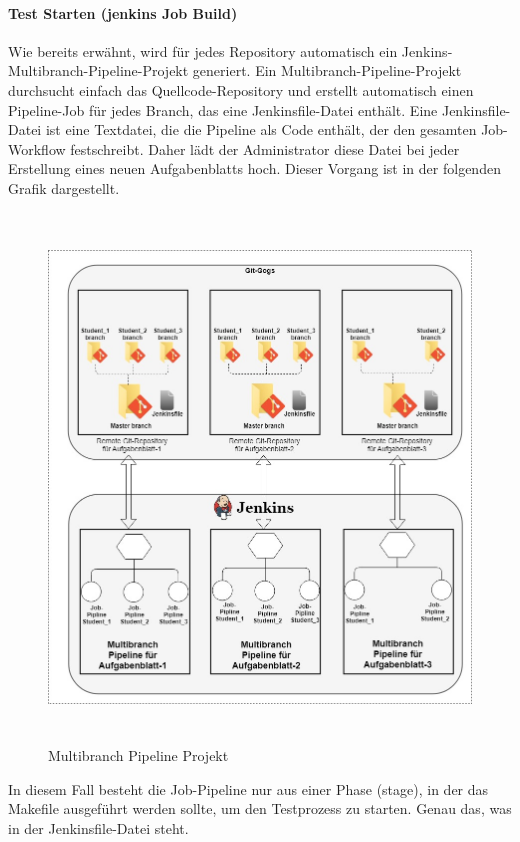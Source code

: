 \documentclass[a4paper,12pt,oneside]{book}
\begin{document}
\paragraph{Test Starten (jenkins Job Build)}
Wie bereits erwähnt, wird für jedes Repository automatisch ein Jenkins-Multibranch-Pipeline-Projekt generiert. Ein Multibranch-Pipeline-Projekt durchsucht einfach das Quellcode-Repository und erstellt automatisch einen Pipeline-Job für jedes Branch, das eine Jenkinsfile-Datei enthält. 
\newline
Eine Jenkinsfile-Datei ist eine Textdatei, die die Pipeline als Code enthält, der den gesamten Job-Workflow festschreibt. Daher lädt der Administrator diese Datei bei jeder Erstellung eines neuen Aufgabenblatts hoch. Dieser Vorgang ist in der folgenden Grafik dargestellt.
\begin{figure}[h!]
	\begin{center}
		\includegraphics[width=13cm, height=14cm]{GogsJenkins.jpg}
		\caption{Multibranch Pipeline Projekt} 
		\label{ Multibranch Pipeline Projek } 
	\end{center}
\end{figure}
\newline
In diesem Fall besteht die Job-Pipeline nur aus einer Phase (stage), in der das Makefile ausgeführt werden sollte, um den Testprozess zu starten. Genau das, was in der Jenkinsfile-Datei steht.
\end{document}
